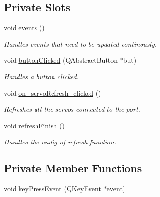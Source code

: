 \subsection*{Private Slots}
\begin{DoxyCompactItemize}
\item 
void \hyperlink{a00006_a18763ff318688083c7ee5a21f22e8e98}{events} ()
\begin{DoxyCompactList}\small\item\em Handles events that need to be updated continously. \end{DoxyCompactList}\item 
void \hyperlink{a00006_a1f7d6790701ff9b1301533b8ad045ede}{button\+Clicked} (Q\+Abstract\+Button $\ast$but)
\begin{DoxyCompactList}\small\item\em Handles a button clicked. \end{DoxyCompactList}\item 
void \hyperlink{a00006_ad5365d452e8bcd86cbb64b9ec42c3b7e}{on\+\_\+servo\+Refresh\+\_\+clicked} ()
\begin{DoxyCompactList}\small\item\em Refreshes all the servos connected to the port. \end{DoxyCompactList}\item 
void \hyperlink{a00006_ae52f8ca70b1bfa4c8d21d25e49e309d7}{refresh\+Finish} ()
\begin{DoxyCompactList}\small\item\em Handles the endig of refresh function. \end{DoxyCompactList}\end{DoxyCompactItemize}
\subsection*{Private Member Functions}
\begin{DoxyCompactItemize}
\item 
void \hyperlink{a00006_aae43fcdcc9941fbce40c35c449bfd39e}{key\+Press\+Event} (Q\+Key\+Event $\ast$event)
\end{DoxyCompactItemize}
